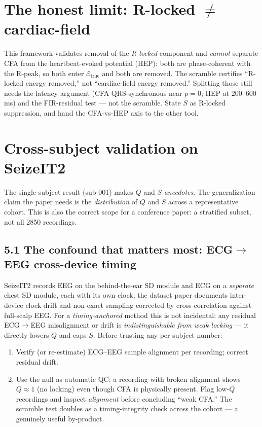 \documentclass[11pt]{article}
\newcommand{\Elock}{\mathcal{E}}
\newcommand{\true}{\mathrm{true}}
\begin{document}
\section{The honest limit: R-locked $\neq$ cardiac-field}

This framework validates removal of the \emph{R-locked} component and \emph{cannot} separate CFA
from the heartbeat-evoked potential (HEP): both are phase-coherent with the R-peak, so both enter
$\Elock_\true$ and both are removed. The scramble certifies ``R-locked energy removed,'' not
``cardiac-field energy removed.'' Splitting those still needs the latency argument (CFA
QRS-synchronous near $p=0$; HEP at $200$--$600$\,ms) and the FIR-residual test --- not the
scramble. State $S$ as R-locked suppression, and hand the CFA-vs-HEP axis to the other tool.

\section{Cross-subject validation on SeizeIT2}
\label{sec:cohort}

The single-subject result (sub-001) makes $Q$ and $S$ \emph{anecdotes}. The generalization claim
the paper needs is the \emph{distribution} of $Q$ and $S$ across a representative cohort. This is
also the correct scope for a conference paper: a stratified subset, not all 2850 recordings.

\subsection*{5.1 The confound that matters most: ECG$\to$EEG cross-device timing}
SeizeIT2 records EEG on the behind-the-ear SD module and ECG on a \emph{separate} chest SD module,
each with its own clock; the dataset paper documents inter-device clock drift and non-exact
sampling corrected by cross-correlation against full-scalp EEG. For a \emph{timing-anchored}
method this is not incidental: any residual ECG$\to$EEG misalignment or drift is
\emph{indistinguishable from weak locking} --- it directly lowers $Q$ and caps $S$. Before trusting
any per-subject number:
\begin{enumerate}[leftmargin=1.4em,itemsep=2pt]
\item Verify (or re-estimate) ECG--EEG sample alignment per recording; correct residual drift.
\item Use the null as automatic QC: a recording with broken alignment shows $Q\approx1$
(no locking) even though CFA is physically present. Flag low-$Q$ recordings and inspect
\emph{alignment} before concluding ``weak CFA.'' The scramble test doubles as a timing-integrity
check across the cohort --- a genuinely useful by-product.
\end{enumerate}
\end{document}
